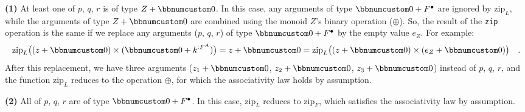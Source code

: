 \textbf{(1)} At least one of $p$, $q$, $r$ is of type $Z+\bbnum 0$.
In this case, any arguments of type $\bbnum 0+F^{\bullet}$ are ignored
by $\text{zip}_{L}$, while the arguments of type $Z+\bbnum 0$ are
combined using the monoid $Z$\textsf{'}s binary operation ($\oplus$). So,
the result of the \lstinline!zip! operation is the same if we replace
any arguments ($p$, $q$, $r$) of type $\bbnum 0+F^{\bullet}$ by
the empty value $e_{Z}$. For example:
\[
\text{zip}_{L}\big((z+\bbnum 0)\times(\bbnum 0+k^{:F^{A}})\big)=z+\bbnum 0=\text{zip}_{L}\big((z+\bbnum 0)\times(e_{Z}+\bbnum 0)\big)\quad.
\]
After this replacement, we have three arguments ($z_{1}+\bbnum 0$,
$z_{2}+\bbnum 0$, $z_{3}+\bbnum 0$) instead of $p$, $q$, $r$,
and the function $\text{zip}_{L}$ reduces to the operation $\oplus$,
for which the associativity law holds by assumption.%
\begin{comment}
\begin{align*}
 & \text{zip}_{L}\big(p\times\text{zip}_{L}(q\times r)\big)\triangleright\varepsilon_{1,23}^{\uparrow L}=\big((z_{1}\oplus z_{2}\oplus z_{3})+\bbnum 0\big)\triangleright\varepsilon_{1,23}^{\uparrow L}=(z_{1}\oplus z_{2}\oplus z_{3})+\bbnum 0\quad,\\
 & \text{zip}_{L}\big(\text{zip}_{L}(p\times q)\times r\big)\triangleright\varepsilon_{12,3}^{\uparrow L}=\big((z_{1}\oplus z_{2}\oplus z_{3})+\bbnum 0\big)\triangleright\varepsilon_{12,3}^{\uparrow L}=(z_{1}\oplus z_{2}\oplus z_{3})+\bbnum 0\quad.
\end{align*}
\end{comment}

\textbf{(2)} All of $p$, $q$, $r$ are of type $\bbnum 0+F^{\bullet}$.
In this case, $\text{zip}_{L}$ reduces to $\text{zip}_{F}$, which
satisfies the associativity law by assumption.

